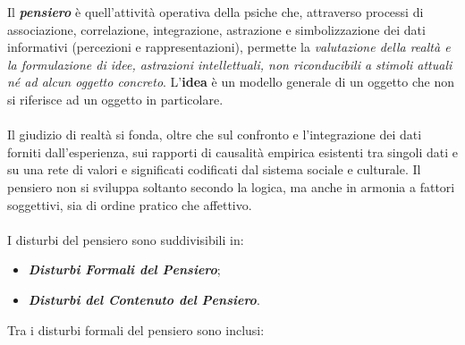 Il \textbf{\emph{pensiero}} è quell'attività operativa della psiche che,
attraverso processi di associazione, correlazione, integrazione,
astrazione e simbolizzazione dei dati informativi (percezioni e
rappresentazioni), permette la \emph{valutazione della realtà e la
formulazione di idee, astrazioni intellettuali, non riconducibili a
stimoli attuali né ad alcun oggetto concreto}. L'\textbf{idea} è un
modello generale di un oggetto che non si riferisce ad un oggetto in
particolare.
\\\\
Il giudizio di realtà si fonda, oltre che sul confronto e l'integrazione
dei dati forniti dall'esperienza, sui rapporti di causalità empirica
esistenti tra singoli dati e su una rete di valori e significati
codificati dal sistema sociale e culturale. Il pensiero non si sviluppa
soltanto secondo la logica, ma anche in armonia a fattori soggettivi,
sia di ordine pratico che affettivo.
\\\\
I disturbi del pensiero sono suddivisibili in:

\begin{itemize}
\item
  \textbf{\emph{Disturbi Formali del Pensiero}};
\item
  \textbf{\emph{Disturbi del Contenuto del Pensiero}}.
\end{itemize}

Tra i disturbi formali del pensiero sono inclusi:

